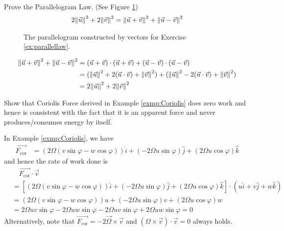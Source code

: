 \begin{Exercise}
\label{ex:parallellaw}
Prove the Parallelogram Law. (See Figure \ref{fig:parallellaw})
\begin{align*}
2\norm{\vec{u}}^2 + 2\norm{\vec{v}}^2 = \norm{\vec{u}+\vec{v}}^2 + \norm{\vec{u}-\vec{v}}^2
\end{align*}
\end{Exercise}
\begin{figure}
\centering
{}
\caption{The parallelogram constructed by vectors for Exercise \ref{ex:parallellaw}.}
\label{fig:parallellaw}
\end{figure}
\begin{Answer}
\begin{align*}
\norm{\vec{u}+\vec{v}}^2 + \norm{\vec{u}-\vec{v}}^2 &= (\vec{u}+\vec{v}) \cdot (\vec{u}+\vec{v}) + (\vec{u}-\vec{v}) \cdot (\vec{u}-\vec{v}) \\
&= (\norm{\vec{u}}^2 + 2(\vec{u} \cdot \vec{v}) + \norm{\vec{v}}^2) + (\norm{\vec{u}}^2 - 2(\vec{u} \cdot \vec{v}) + \norm{\vec{v}}^2) \\
&= 2\norm{\vec{u}}^2 + 2\norm{\vec{v}}^2
\end{align*}
\end{Answer}

\begin{Exercise}
Show that Coriolis Force derived in Example \ref{exmp:Coriolis} does zero work and hence is consistent with the fact that it is an apparent force and never produces/consumes energy by itself.
\end{Exercise}
\begin{Answer}
In Example \ref{exmp:Coriolis}, we have
\begin{align*}
\overrightarrow{F_\text{cor}} &= (2\Omega(v\sin\varphi - w\cos\varphi))\hat{i} + (-2\Omega u\sin\varphi)\hat{j} + (2\Omega u\cos\varphi)\hat{k}    
\end{align*}
and hence the rate of work done is
\begin{align*}
&\quad \overrightarrow{F_\text{cor}} \cdot \vec{v} \\
&= [(2\Omega(v\sin\varphi - w\cos\varphi))\hat{i} + (-2\Omega u\sin\varphi)\hat{j} + (2\Omega u\cos\varphi)\hat{k}] \cdot (u\hat{i} + v\hat{j} + w\hat{k}) \\
&= (2\Omega(v\sin\varphi - w\cos\varphi))u + (-2\Omega u\sin\varphi)v + (2\Omega u\cos\varphi)w \\
&= 2\Omega uv\sin\varphi - 2\Omega uw\sin\varphi - 2\Omega uv\sin\varphi + 2\Omega uw\sin\varphi = 0
\end{align*}
Alternatively, note that $\overrightarrow{F_\text{cor}} = -2\overrightarrow{\Omega} \times \vec{v}$ and $({\Omega} \times \vec{v}) \cdot \vec{v} = 0$ always holds.
\end{Answer}